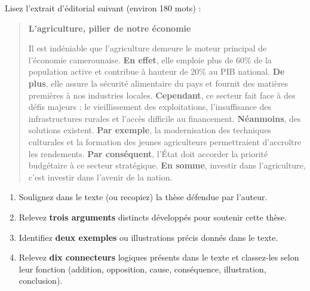 \documentclass[11pt]{article}
\newcommand{\cle}[1]{{\popxbold\color{popdark}#1}}
\begin{document}
\begin{exercice}
Lisez l'extrait d'éditorial suivant (environ 180 mots) :

\begin{quote}
\textbf{L'agriculture, pilier de notre économie}

Il est indéniable que l'agriculture demeure le moteur principal de l'économie camerounaise. \textbf{En effet}, elle emploie plus de 60\% de la population active et contribue à hauteur de 20\% au PIB national. \textbf{De plus}, elle assure la sécurité alimentaire du pays et fournit des matières premières à nos industries locales. \textbf{Cependant}, ce secteur fait face à des défis majeurs : le vieillissement des exploitations, l'insuffisance des infrastructures rurales et l'accès difficile au financement. \textbf{Néanmoins}, des solutions existent. \textbf{Par exemple}, la modernisation des techniques culturales et la formation des jeunes agriculteurs permettraient d'accroître les rendements. \textbf{Par conséquent}, l'État doit accorder la priorité budgétaire à ce secteur stratégique. \textbf{En somme}, investir dans l'agriculture, c'est investir dans l'avenir de la nation.
\end{quote}

\begin{enumerate}
    \item Soulignez dans le texte (ou recopiez) la \cle{thèse} défendue par l'auteur.
    \item Relevez \textbf{trois arguments} distincts développés pour soutenir cette thèse.
    \item Identifiez \textbf{deux exemples} ou illustrations précis donnés dans le texte.
    \item Relevez \textbf{dix connecteurs} logiques présents dans le texte et classez-les selon leur fonction (addition, opposition, cause, conséquence, illustration, conclusion).
\end{enumerate}
\end{exercice}
\end{document}
